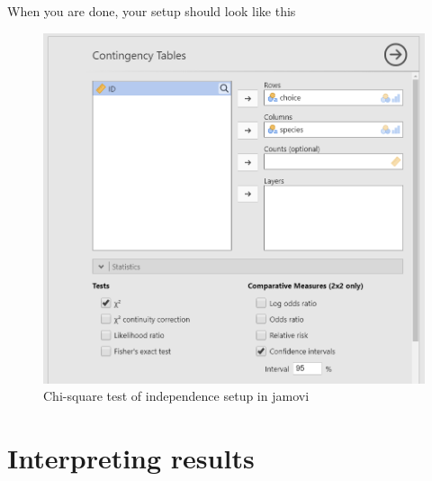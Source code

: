 \documentclass[
]{book}
\begin{document}
When you are done, your setup should look like this

\begin{figure}

{\centering \includegraphics[width=0.8\linewidth]{images/11-independence/independence_setup} 

}

\caption{Chi-square test of independence setup in jamovi}\label{fig:unnamed-chunk-2}
\end{figure}

\hypertarget{interpreting-results-2}{%
\section{Interpreting results}\label{interpreting-results-2}}
\end{document}
